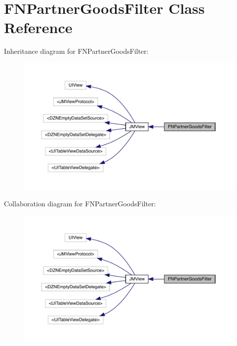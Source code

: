 \hypertarget{interface_f_n_partner_goods_filter}{}\section{F\+N\+Partner\+Goods\+Filter Class Reference}
\label{interface_f_n_partner_goods_filter}


Inheritance diagram for F\+N\+Partner\+Goods\+Filter\+:\nopagebreak
\begin{figure}[H]
\begin{center}
\leavevmode
\includegraphics[width=350pt]{interface_f_n_partner_goods_filter__inherit__graph}
\end{center}
\end{figure}


Collaboration diagram for F\+N\+Partner\+Goods\+Filter\+:\nopagebreak
\begin{figure}[H]
\begin{center}
\leavevmode
\includegraphics[width=350pt]{interface_f_n_partner_goods_filter__coll__graph}
\end{center}
\end{figure}
